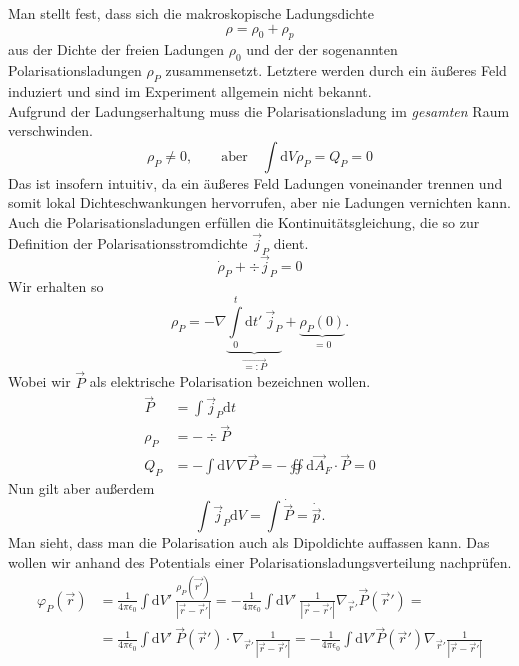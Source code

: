 Man stellt fest, dass sich die makroskopische Ladungsdichte 
\begin{equation*}
\rho = \rho_0 + \rho_p
\end{equation*}
aus der Dichte der freien Ladungen $\rho_0$ und der der sogenannten Polarisationsladungen $\rho_P$ zusammensetzt. Letztere werden durch ein äußeres Feld induziert und sind im Experiment allgemein nicht bekannt. \\
Aufgrund der Ladungserhaltung muss die Polarisationsladung im \emph{gesamten }Raum verschwinden.
\begin{equation*}
\rho_P\neq 0, \qquad \text{aber}\quad \int\mathrm{d}V \rho_P = Q_P = 0
\end{equation*}
Das ist insofern intuitiv, da ein äußeres Feld Ladungen voneinander trennen und somit lokal Dichteschwankungen hervorrufen, aber nie Ladungen vernichten kann. \\
Auch die Polarisationsladungen erfüllen die Kontinuitätsgleichung, die so zur Definition der Polarisationsstromdichte $\vec{j}_P$ dient.
\begin{equation*}
\dot{\rho}_P+\div\vec{j}_P=0
\end{equation*}
Wir erhalten so 
\begin{equation*}
\rho_P = -\nabla\underbrace{\int\limits_0^t\mathrm{d}t'\ \vec{j}_P}_{\vec{=:P}} + \underbrace{\rho_P(0)}_{=0}.
\end{equation*}
Wobei wir $\vec{P}$ als elektrische Polarisation bezeichnen wollen.
\begin{align*}
\vec{P} &=\int\vec{j}_P\mathrm{d}t\\
\rho_P &= -\div\vec{P}\\
Q_P &=-\int\mathrm{d}V\ \nabla\vec{P}=-\oiint\mathrm{d}\vec{A}_F\cdot\vec{P}=0
\end{align*}
Nun gilt aber außerdem
\begin{equation*}
\int\vec{j}_P\mathrm{d}V = \int\dot{\vec{P}} = \dot{\vec{p}}.
\end{equation*}
Man sieht, dass man die Polarisation auch als Dipoldichte auffassen kann. Das wollen wir anhand des Potentials einer Polarisationsladungsverteilung nachprüfen.
\begin{align*}
\varphi_P(\vec{r}) &=\frac{1}{4\pi\epsilon_0} \int\mathrm{d}V'\ \frac{\rho_P(\vec{r'})}{|\vec{r}-\vec{r}'|} = -\frac{1}{4\pi\epsilon_0}\int\mathrm{d}V'\ \frac{1}{|\vec{r}-\vec{r}'|}\nabla_{\vec{r}'}\vec{P}(\vec{r}') = \\
&=\frac{1}{4\pi\epsilon_0}\int\mathrm{d}V'\ \vec{P}(\vec{r}')\cdot\nabla_{\vec{r}'}\frac{1}{|\vec{r}-\vec{r}'|} =-\frac{1}{4\pi\epsilon_0}\int\mathrm{d}V' \vec{P}(\vec{r}')\nabla_{\vec{r}'}\frac{1}{|\vec{r}-\vec{r}'|}
\end{align*}
